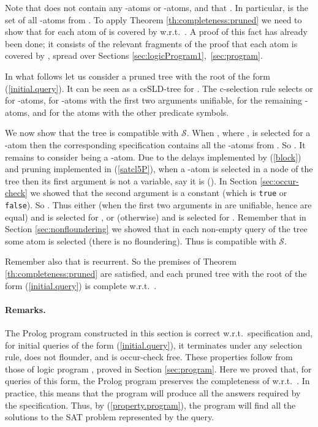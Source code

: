 \documentclass{tlp}
\renewcommand*{\S}{{\ensuremath{\mathscr S}}\xspace}
\begin{document}
{Note that  does not contain any -atoms or -atoms,
and that .
In particular,  is the set of all -atoms from .
To apply Theorem \ref{th:completeness:pruned}
we need to show that
for  each atom of  is covered by  w.r.t.\ .
A proof of this fact has already been
done; 
it consists of the relevant fragments of the proof that 
each atom  is covered by , spread over Sections
\ref{sec:logicProgram1},~\ref{sec:program}.












In what follows let us consider
a pruned tree  with the root of the form (\ref{initial.query}).  It
can be seen as a csSLD-tree for .  The c-selection rule
selects  or  for  -atoms, 
 for -atoms with the first two arguments unifiable,
 for the remaining -atoms,
and  for the atoms with the other predicate symbols.



We now show that the tree  is compatible with \S.
When  , where ,  is selected for a -atom  then
the corresponding specification  contains all the -atoms from .
So .
It remains to consider  being a -atom.
Due to the delays implemented by (\ref{block}) and 
pruning implemented in (\ref{satcl5P}), when a -atom  is
selected in a node of the tree then its first argument is not a variable,
say it is   ().
In Section \ref{sec:occur-check} we showed that the second argument is a
constant  (which is {\tt true} or {\tt false}).  
So .
Thus either 
(when the first two arguments in  are unifiable, hence are equal)
and  is selected for , or
 (otherwise)
and  is selected for .
Remember that in Section \ref{sec:nonfloundering} we showed 
that in each non-empty query of the tree some atom is selected (there is no
floundering). 
Thus  is compatible with  \S.





Remember also that  is recurrent. 
So the premises of Theorem \ref{th:completeness:pruned}
are satisfied, and each pruned tree with the root of the form
(\ref{initial.query}) is complete w.r.t.\ .


\paragraph{Remarks.}
The Prolog program constructed in this section
is correct w.r.t.\ specification  and, for initial queries of the form 
(\ref{initial.query}), it terminates under any selection rule,
does not flounder, and is occur-check free.  These properties follow from
those of logic program , proved in Section \ref{sec:program}.
Here we proved that, for queries of this form,
the Prolog program preserves the completeness 
of  w.r.t.~.
In practice, this means that the program will produce
all the answers required by the specification.
Thus, by (\ref{property.program}), the program will find all the solutions to
the SAT problem represented by the query.



}
\end{document}
